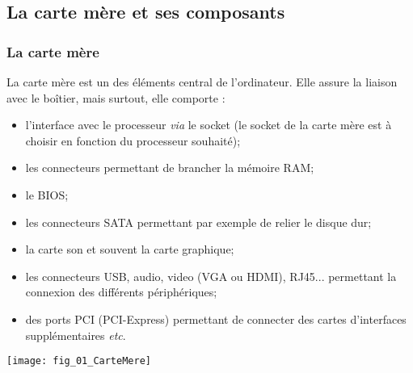 \subsection{La carte mère et ses composants}
\subsubsection{La carte mère}
\noindent
\begin{minipage}[c]{.49\linewidth}
\noindent La carte mère est un des éléments central de l'ordinateur. Elle assure la liaison avec le boîtier, mais surtout, elle comporte : 
\begin{itemize}
\item l'interface avec le processeur \textit{via} le socket (le socket de la carte mère est à choisir en fonction du processeur souhaité);
\item les connecteurs permettant de brancher la mémoire RAM;
\item le BIOS;
\item les connecteurs SATA permettant par exemple de relier le disque dur;
\item la carte son et souvent la carte graphique;
\item les connecteurs USB, audio, video (VGA ou HDMI), RJ45... permettant la connexion des différents périphériques;
\item des ports PCI (PCI-Express) permettant de connecter des cartes d'interfaces supplémentaires \textit{etc}.
\end{itemize}
\end{minipage} \hfill
\begin{minipage}[c]{.49\linewidth}
\begin{center}
\texttt{[image: fig\_01\_CarteMere]}
\end{center}
\end{minipage}

